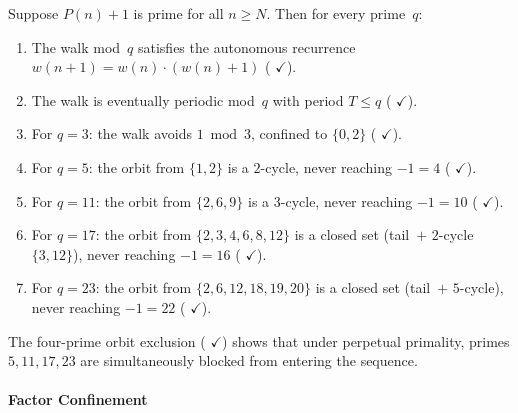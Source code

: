 \begin{theorem}
\label{thm:perpetual-periodicity}
Suppose $P(n)+1$ is prime for all $n \geq N$.  Then for every prime~$q$:
\begin{enumerate}[nosep]
\item The walk mod~$q$ satisfies the autonomous recurrence
  $w(n{+}1) = w(n) \cdot (w(n){+}1)$
  (
  {\color{leanink}$\checkmark$}).
\item The walk is eventually periodic mod~$q$ with period $T \leq q$
  (
  {\color{leanink}$\checkmark$}).
\item For $q = 3$: the walk avoids $1 \bmod 3$, confined to $\{0, 2\}$
  (
  {\color{leanink}$\checkmark$}).
\item For $q = 5$: the orbit from $\{1, 2\}$ is a $2$-cycle, never reaching
  $-1 = 4$
  (
  {\color{leanink}$\checkmark$}).
\item For $q = 11$: the orbit from $\{2, 6, 9\}$ is a $3$-cycle, never
  reaching $-1 = 10$
  (
  {\color{leanink}$\checkmark$}).
\item For $q = 17$: the orbit from $\{2, 3, 4, 6, 8, 12\}$ is a closed
  set (tail~$+$ $2$-cycle $\{3, 12\}$), never reaching $-1 = 16$
  (
  {\color{leanink}$\checkmark$}).
\item For $q = 23$: the orbit from $\{2, 6, 12, 18, 19, 20\}$ is a closed
  set (tail~$+$ $5$-cycle), never reaching $-1 = 22$
  (
  {\color{leanink}$\checkmark$}).
\end{enumerate}
The four-prime orbit exclusion
(
{\color{leanink}$\checkmark$})
shows that under perpetual primality, primes $5, 11, 17, 23$ are
simultaneously blocked from entering the sequence.
\end{theorem}

\paragraph{Factor Confinement}
\label{sec:factor-confinement}


